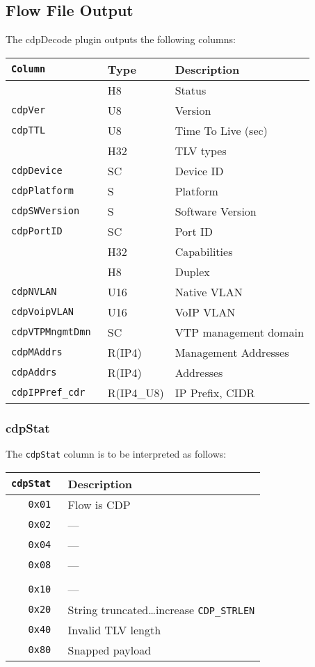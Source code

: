 \documentclass[documentation]{subfiles}
\begin{document}
\subsection{Flow File Output}
The cdpDecode plugin outputs the following columns:
\begin{longtable}{>{\tt}lll}
    \toprule
    {\bf Column} & {\bf Type} & {\bf Description}\\
    \midrule\endhead%
    \nameref{cdpStat}     & H8         & Status\\
    cdpVer                & U8         & Version\\
    cdpTTL                & U8         & Time To Live (sec)\\
    \nameref{cdpTLVTypes} & H32        & TLV types\\
    cdpDevice             & SC         & Device ID\\
    cdpPlatform           & S          & Platform\\
    cdpSWVersion          & S          & Software Version\\
    cdpPortID             & SC         & Port ID\\
    \nameref{cdpCaps}     & H32        & Capabilities\\
    \nameref{cdpDuplex}   & H8         & Duplex\\
    cdpNVLAN              & U16        & Native VLAN\\
    cdpVoipVLAN           & U16        & VoIP VLAN\\
    cdpVTPMngmtDmn        & SC         & VTP management domain\\
    cdpMAddrs             & R(IP4)     & Management Addresses\\
    cdpAddrs              & R(IP4)     & Addresses\\
    cdpIPPref\_cdr        & R(IP4\_U8) & IP Prefix, CIDR\\
    \bottomrule
\end{longtable}

\subsubsection{cdpStat}\label{cdpStat}
The {\tt cdpStat} column is to be interpreted as follows:
\begin{longtable}{>{\tt}rl}
    \toprule
    {\bf cdpStat} & {\bf Description}\\
    \midrule\endhead%
    0x01 & Flow is CDP\\
    0x02 & ---\\
    0x04 & ---\\
    0x08 & ---\\
    \\
    0x10 & ---\\
    0x20 & String truncated\ldots increase {\tt CDP\_STRLEN}\\
    0x40 & Invalid TLV length\\
    0x80 & Snapped payload\\
    \bottomrule
\end{longtable}
\end{document}
